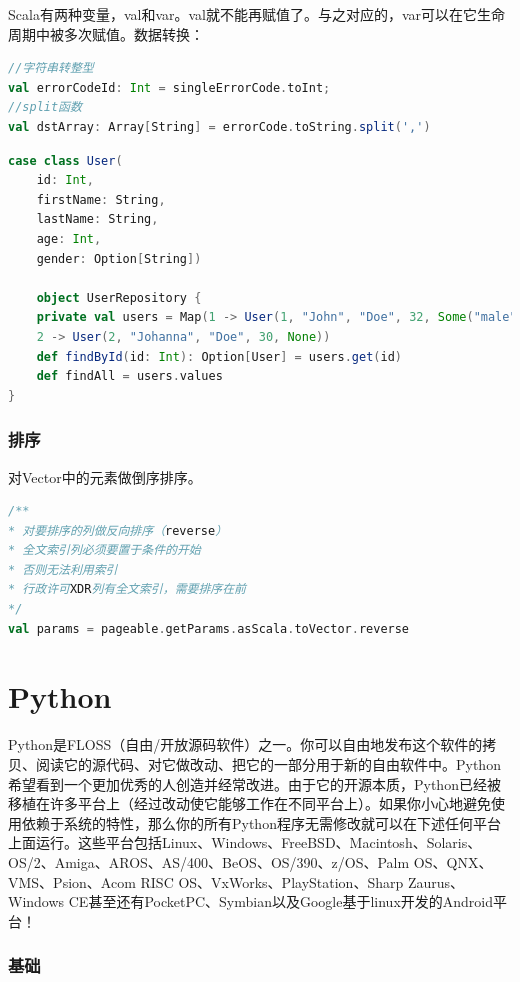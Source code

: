 \documentclass[letter]{book}
\begin{document}
Scala有两种变量，val和var。val就不能再赋值了。与之对应的，var可以在它生命周期中被多次赋值。数据转换：

\begin{lstlisting}[language=Scala]
//字符串转整型
val errorCodeId: Int = singleErrorCode.toInt;
//split函数
val dstArray: Array[String] = errorCode.toString.split(',')
\end{lstlisting}


\begin{lstlisting}[language=Scala]
case class User(  
	id: Int,  
	firstName: String,  
	lastName: String,  
	age: Int,  
	gender: Option[String])  
	
	object UserRepository {  
	private val users = Map(1 -> User(1, "John", "Doe", 32, Some("male")),  
	2 -> User(2, "Johanna", "Doe", 30, None))  
	def findById(id: Int): Option[User] = users.get(id)  
	def findAll = users.values  
}  
\end{lstlisting}

\subsection{排序}

对Vector中的元素做倒序排序。

\begin{lstlisting}[language=Scala]
/**
* 对要排序的列做反向排序（reverse）
* 全文索引列必须要置于条件的开始
* 否则无法利用索引
* 行政许可XDR列有全文索引，需要排序在前
*/
val params = pageable.getParams.asScala.toVector.reverse  
\end{lstlisting}

\chapter{Python}

Python是FLOSS（自由/开放源码软件）之一。你可以自由地发布这个软件的拷贝、阅读它的源代码、对它做改动、把它的一部分用于新的自由软件中。Python希望看到一个更加优秀的人创造并经常改进。由于它的开源本质，Python已经被移植在许多平台上（经过改动使它能够工作在不同平台上）。如果你小心地避免使用依赖于系统的特性，那么你的所有Python程序无需修改就可以在下述任何平台上面运行。这些平台包括Linux、Windows、FreeBSD、Macintosh、Solaris、OS/2、Amiga、AROS、AS/400、BeOS、OS/390、z/OS、Palm OS、QNX、VMS、Psion、Acom RISC OS、VxWorks、PlayStation、Sharp Zaurus、Windows CE甚至还有PocketPC、Symbian以及Google基于linux开发的Android平台！

\subsection{基础}
\end{document}
